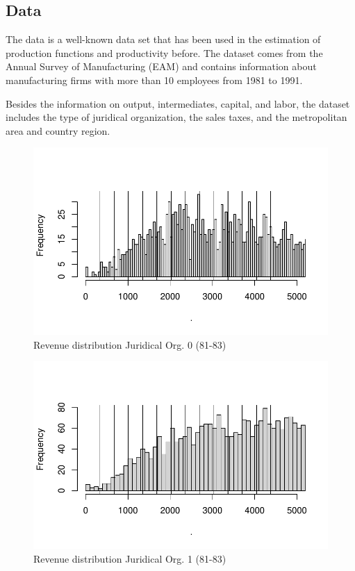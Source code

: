 \documentclass[
  12pt]{article}
\begin{document}
\hypertarget{data}{%
\subsection{Data}\label{data}}

The data is a well-known data set that has been used in the estimation
of production functions and productivity before. The dataset comes from
the Annual Survey of Manufacturing (EAM) and contains information about
manufacturing firms with more than 10 employees from 1981 to 1991.

Besides the information on output, intermediates, capital, and labor,
the dataset includes the type of juridical organization, the sales
taxes, and the metropolitan area and country region.

\begin{figure}

{\centering \includegraphics{Tax-Prod_files/figure-pdf/fig-revenue-hist-bunch-0-1.pdf}

}

\caption{\label{fig-revenue-hist-bunch-0}Revenue distribution Juridical
Org. 0 (81-83)}

\end{figure}

\begin{figure}

{\centering \includegraphics{Tax-Prod_files/figure-pdf/fig-revenue-hist-bunch-1-1.pdf}

}

\caption{\label{fig-revenue-hist-bunch-1}Revenue distribution Juridical
Org. 1 (81-83)}

\end{figure}
\end{document}
